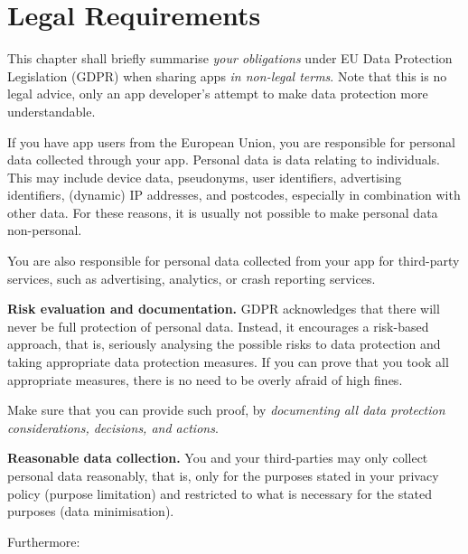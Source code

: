 \documentclass[
]{book}
\begin{document}
\hypertarget{legal-requirements}{%
\chapter{Legal Requirements}\label{legal-requirements}}

This chapter shall briefly summarise \emph{your obligations} under EU Data Protection Legislation (GDPR) when sharing apps \emph{in non-legal terms}. Note that this is no legal advice, only an app developer's attempt to make data protection more understandable.

If you have app users from the European Union, you are responsible for personal data collected through your app. Personal data is data relating to individuals. This may include device data, pseudonyms, user identifiers, advertising identifiers, (dynamic) IP addresses, and postcodes, especially in combination with other data. For these reasons, it is usually not possible to make personal data non-personal.

You are also responsible for personal data collected from your app for third-party services, such as advertising, analytics, or crash reporting services.

\textbf{Risk evaluation and documentation.} GDPR acknowledges that there will never be full protection of personal data. Instead, it encourages a risk-based approach, that is, seriously analysing the possible risks to data protection and taking appropriate data protection measures. If you can prove that you took all appropriate measures, there is no need to be overly afraid of high fines.

Make sure that you can provide such proof, by \emph{documenting all data protection considerations, decisions, and actions}.

\textbf{Reasonable data collection.} You and your third-parties may only collect personal data reasonably, that is, only for the purposes stated in your privacy policy (purpose limitation) and restricted to what is necessary for the stated purposes (data minimisation).

Furthermore:
\end{document}
